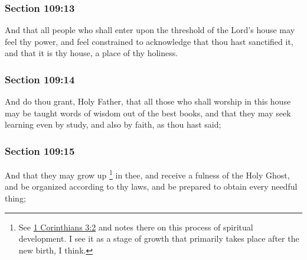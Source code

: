 	\subsubsection{Section 109:13} %
		\label{DC109-13}

		And that all people who shall enter upon the threshold of the Lord's house may feel thy power, and feel constrained to acknowledge that thou hast sanctified it, and that it is thy house, a place of thy holiness.


	\subsubsection{Section 109:14} %
		\label{DC109-14}

		And do thou grant, Holy Father, that all those who shall worship in this house may be taught words of wisdom out of the best books, and that they may seek learning even by study, and also by faith, as thou hast said;


	\subsubsection{Section 109:15} %
		\label{DC109-15}

		And that they may grow up%
			\footnote{%
				See \hyperref[1CORINTHIANS-3-2]{1 Corinthians 3:2} and notes there on this process of spiritual development. I see it as a stage of growth that primarily takes place after the new birth, I think.
				}
		in thee, and receive a fulness of the Holy Ghost, and be organized according to thy laws, and be prepared to obtain every needful thing;

